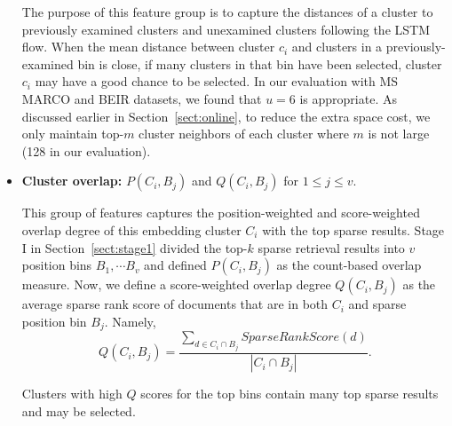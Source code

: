 \begin{itemize}[leftmargin=*]
The purpose of this feature group is to capture the distances of a cluster to previously examined clusters and unexamined clusters 
following the LSTM flow. 
When the mean distance  between cluster $c_i$  and clusters in a previously-examined  bin is close, if  
many clusters in that bin have been selected, cluster 
$c_i$ may have a good  chance to  be selected.
In our evaluation with MS MARCO and BEIR datasets, we found that $u=6$ is appropriate.
As discussed earlier in Section~\ref{sect:online}, to reduce the extra space cost, 
we only maintain top-$m$ cluster neighbors of each cluster where $m$ is not large  (128 in our evaluation).
    

\item \textbf{Cluster overlap:} $P(C_i, B_j)$ and $Q(C_i,   B_j)$     for $1 \leq j \le v$.

This group of features captures the position-weighted and score-weighted overlap degree of this embedding cluster $C_i$ with the top sparse results.
Stage I in Section~\ref{sect:stage1} divided the top-$k$ sparse retrieval results into $v$ position bins
$B_1, \cdots B_v$ and defined   $P (C_i, B_j)$ as  the count-based overlap measure.
Now, we define a score-weighted overlap degree $Q (C_i,   B_j)$     
as the average sparse rank score of documents that  are in both $C_i$ and sparse position bin $B_j$.  
Namely,
\[
Q (C_i,   B_j) = \frac{ \sum_{d \in C_i \cap B_j} SparseRankScore(d)} { |C_i  \cap  B_j|}.    
\]


Clusters with high $Q$ scores for the top bins contain many top sparse results and may be selected.




\end{itemize}


